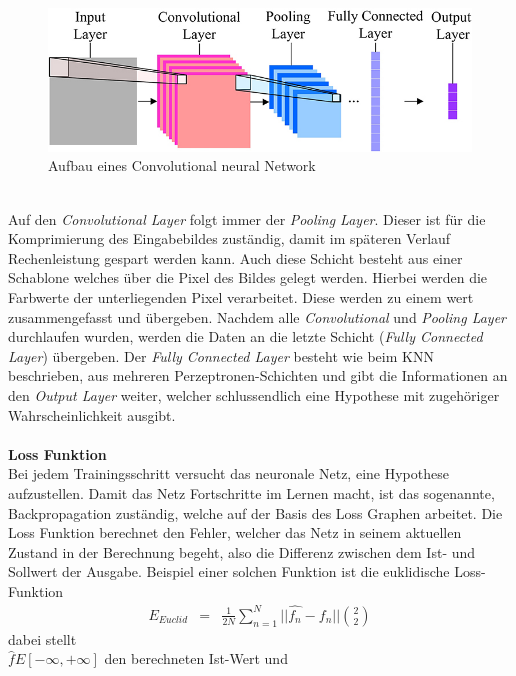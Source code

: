 \documentclass[a4paper,12pt,oneside]{article}
\begin{document}
\begin{figure}
	[h]
	\centering
	\includegraphics[scale=0.5]{Sources/cnnet.jpg}
	\caption{Aufbau eines Convolutional neural Network \cite{info7040061}}
	\label{img:grafik-dummy}
\end{figure}\\
Auf den \textit{Convolutional Layer} folgt immer der \textit{Pooling Layer}. Dieser ist für die Komprimierung des Eingabebildes zuständig, damit im späteren Verlauf Rechenleistung gespart werden kann. Auch diese Schicht besteht aus einer Schablone welches über die Pixel des Bildes gelegt werden. Hierbei werden die Farbwerte der unterliegenden Pixel verarbeitet. Diese werden zu einem wert zusammengefasst und übergeben. Nachdem alle \textit{Convolutional} und \textit{Pooling Layer} durchlaufen wurden, werden die Daten an die letzte Schicht (\textit{Fully Connected Layer}) übergeben. Der \textit{Fully Connected Layer} besteht wie beim KNN beschrieben, aus mehreren Perzeptronen-Schichten und gibt die Informationen an den \textit{Output Layer} weiter, welcher schlussendlich eine Hypothese mit zugehöriger Wahrscheinlichkeit ausgibt.\\\\
\textbf{Loss Funktion}\\
Bei jedem Trainingsschritt versucht das neuronale Netz, eine Hypothese aufzustellen. Damit das Netz Fortschritte im Lernen macht, ist das sogenannte, Backpropagation zuständig, welche auf der Basis des Loss Graphen arbeitet. Die Loss Funktion berechnet den Fehler, welcher das Netz in seinem aktuellen Zustand in der Berechnung begeht, also die Differenz zwischen dem Ist- und Sollwert der Ausgabe. Beispiel einer solchen Funktion ist die euklidische Loss-Funktion
\begin{eqnarray} E_{Euclid}&=&\frac{1}{2N} \sum_{n=1}^N || \hat{f_{n}}-f_{n} || \binom{2}{2} \end{eqnarray}
dabei stellt\\

	$\hat{f}E[-\infty,+\infty]$ den berechneten Ist-Wert und
	
\end{document}
